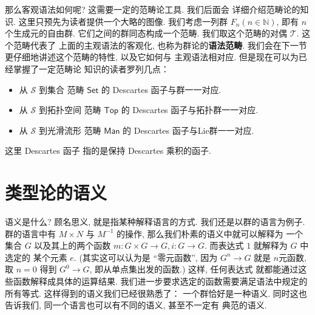 \documentclass[UTF8]{ctexbook}
\theoremstyle{plain}
\theoremstyle{definition}
\theoremstyle{remark}
\begin{document}
那么客观语法如何呢? 这需要一定的范畴论工具. 我们后面会
详细介绍范畴论的知识. 这里只预先为读者提供一个大略的图像.
我们考虑一列群 \(F_n (n \in \mathbb N)\), 即有
\(n\) 个生成元的自由群. 它们之间的群同态构成一个范畴.
我们取这个范畴的对偶 \(\mathcal T\). 这个范畴代表了
上面的主观语法的客观化, 也称为群论的\textbf{语法范畴}.
我们会在下一节更仔细地讲述这个范畴的特性, 以及它如何与
主观语法相对应. 但是现在可以为已经掌握了一定范畴论
知识的读者罗列几点：
\begin{itemize}
\item 从 \(\mathcal S\) 到集合
范畴 \(\textsf{Set}\) 的 Descartes 函子与群一一对应.
\item 从 \(\mathcal S\) 到拓扑空间
范畴 \(\textsf{Top}\) 的 Descartes 函子与拓扑群一一对应.
\item 从 \(\mathcal S\) 到光滑流形
范畴 \(\textsf{Man}\) 的 Descartes 函子与Lie群一一对应.
\end{itemize}
这里 Descartes 函子
指的是保持 Descartes 乘积的函子.

\section{类型论的语义}\label{intro:semantics}
语义是什么? 顾名思义, 就是指某种解释语言的方式.
我们还是以群的语言为例子. 群的语言中有 \(M\times N\)
与 \(M^{-1}\) 的操作, 那么我们朴素的语义中就可以解释为
一个集合 \(G\) 以及其上的两个函数 \(m : G\times G\to G,
i : G \to G\). 而表达式 \(1\) 就解释为 \(G\) 中选定的
某个元素 \(e\). (其实这可以认为是 “零元函数”, 因为
\(G^n \to G\) 就是 \(n\)元函数, 取 \(n = 0\) 得到
\(G^0 \to G\), 即从单点集出发的函数.) 这样, 任何表达式
就都能通过这些函数解释成具体的运算结果.
我们进一步要求选定的函数需要满足语法中规定的所有等式.
这样得到的语义我们已经很熟悉了： 一个群恰好是一种语义.
同时这也告诉我们, 同一个语言也可以有不同的语义, 甚至不一定有
典范的语义.
\end{document}
